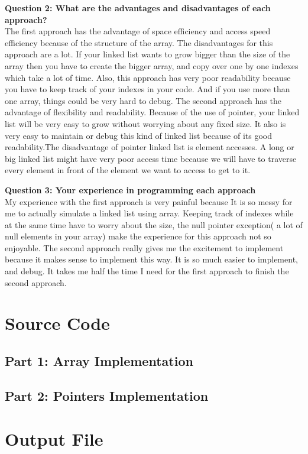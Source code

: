 \documentclass{article}
\begin{document}
\textbf{Question 2: What are the advantages and disadvantages of each
approach?}\\ The first approach has the advantage of space efficiency and access
speed efficiency because of the structure of the array. The disadvantages for this approach are a lot. If your linked list wants to grow bigger than the size of the array then you have to create the bigger array, and copy over one by one indexes which take a lot of time. Also, this approach has very poor readability because you have to keep track of your indexes in your code. And if you use more than one array, things could be very hard to debug.
	 The second approach has the advantage of flexibility and readability. Because of the use of pointer, your linked list will be very easy to grow without worrying about any fixed size. It also is very easy to maintain or debug this kind of linked list because of its good readability.The disadvantage of pointer linked list is element accesses. A long or big linked list might have very poor access time because we will have to traverse every element in front of the element we want to access to get to it.

\textbf{Question 3: Your experience in programming each approach}\\
	My experience with the first approach is very painful because It is so messy for me to actually simulate a linked list using array. Keeping track of indexes while at the same time have to worry about the size, the null pointer exception( a lot of null elements in your array) make the experience for this approach not so enjoyable.
	The second approach really gives me the excitement to implement because it makes sense to implement this way. It is so much easier to implement, and debug. It takes me half the time I need for the first approach to finish the second approach.
\newpage

\section{Source Code}
\subsection{Part 1: Array Implementation}


\subsection{Part 2: Pointers Implementation}




\section{Output File}


\end{document}
